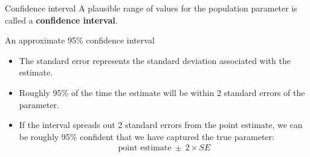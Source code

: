 \documentclass[12pt,a4paper]{beamer}
\begin{document}
\begin{frame}{Confidence interval }
	\centering
	A plausible range of values for the population parameter is called a \textbf{confidence interval}.
\end{frame}
\begin{frame}{An approximate 95\% confidence interval 
}
 
	 

	\begin{itemize}
		\item The standard error represents the standard deviation associated with the estimate.
		\item Roughly 95\% of the time the estimate will be within 2 standard errors of the parameter.
		\item If the interval spreads out 2 standard errors from the point estimate, we can be roughly 
		95\% confident that we have captured the true parameter:
		\begin{eqnarray*}
		\text{point estimate}\ \pm\ 2\times SE
		\end{eqnarray*}
	\end{itemize}
\end{frame}
\end{document}
